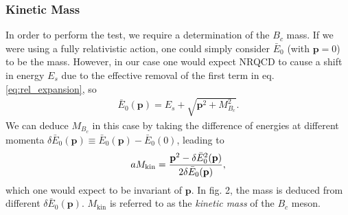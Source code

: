 
\subsubsection{Kinetic Mass}
\label{sec:kinetic_mass}

In order to perform the test, we require a determination of the $B_c$ mass. If we were using a fully relativistic action, one could simply consider $\bar{E}_0$ (with ${\textbf{p}}=0$) to be the mass. However, in our case one would expect NRQCD to cause a shift in energy $E_s$ due to the effective removal of the first term in eq. \eqref{eq:rel_expansion}, so
\begin{align}
 \bar{E}_0({\textbf{p}}) = E_s + \sqrt{ {\textbf{p}}^2 + M_{B_c}^2 }.
 \label{eq:euclidean_energy}
\end{align}
We can deduce $M_{B_c}$ in this case by taking the difference of energies at different momenta $\delta \bar{E}_0({\textbf{p}}) \equiv \bar{E}_0({\textbf{p}}) - \bar{E}_0(0)$, leading to
\begin{align}
 aM_{\text{kin}} = { {\textbf{p}}^2 - \delta \bar{E}_0^2({\textbf{p}}) \over 2\delta \bar{E}_0({\textbf{p}}) },
 \label{eq:kinetic_mass}
\end{align}
which one would expect to be invariant of ${\textbf{p}}$. In fig. 2, the mass is deduced from different $\delta \bar{E}_0({\textbf{p}})$. $M_{\text{kin}}$ is referred to as the \textit{kinetic mass} of the $B_c$ meson.


